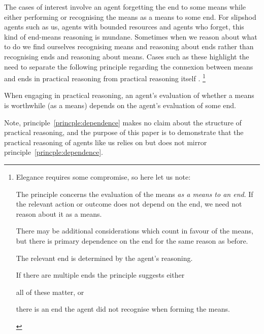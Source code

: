 \documentclass[10pt]{article}
\begin{document}
The cases of interest involve an agent forgetting the end to some means while either performing or recognising the means as a means to some end.
For slipshod agents such as us, agents with bounded resources and agents who forget, this kind of end-means reasoning is mundane.
Sometimes when we reason about what to do we find ourselves recognising means and reasoning about ends rather than recognising ends and reasoning about means.
Cases such as these highlight the need to separate the following principle regarding the connexion between means and ends in practical reasoning from practical reasoning itself .\nolinebreak
\footnote{Elegance requires some compromise, so here let us note:
  \begin{enumerate*}[label=\alph*)]
  \item The principle concerns the evaluation of the means \emph{as a means to an end}.
    If the relevant action or outcome does not depend on the end, we need not reason about it as a means.
  \item There may be additional considerations which count in favour of the means, but there is primary dependence on the end for the same reason as before.
  \item The relevant end is determined by the agent's reasoning.
  \item If there are multiple ends the principle suggests either
    \begin{enumerate*}[label=\roman*)]
    \item all of these matter, or
    \item there is an end the agent did not recognise when forming the means.
    \end{enumerate*}
  \end{enumerate*}
}

\begin{principle}\label{princple:dependence}
  When engaging in practical reasoning, an agent's evaluation of whether a means is worthwhile (as a means) depends on the agent's evaluation of some end.
\end{principle}

Note, principle~\ref{princple:dependence} makes no claim about the structure of practical reasoning, and the purpose of this paper is to demonstrate that the practical reasoning of agents like us relies on but does not mirror principle~\ref{princple:dependence}.
\end{document}
